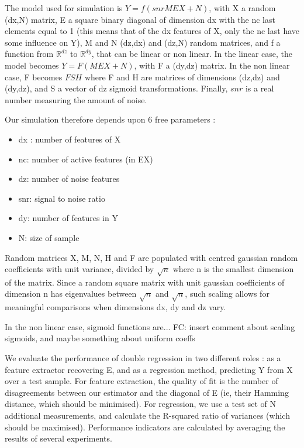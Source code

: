 \documentclass{article}
\begin{document}
The model used for simulation is $Y=f(snr MEX+N)$, with X a random (dx,N) matrix, E a square binary diagonal of dimension dx with the nc last elements equal to 1 (this means that of the dx features of X, only the nc last have some influence on Y), M and N (dz,dx) and (dz,N) random matrices, and f a function from $\mathbb{R}^{dz}$ to $\mathbb{R}^{dy}$, that can be linear or non linear. In the linear case, the model becomes $Y=F(MEX+N)$, with F a (dy,dz) matrix. In the non linear case, F becomes $FSH$ where F and H are matrices of dimensions (dz,dz) and (dy,dz), and S a vector of dz sigmoid transformations. Finally, $snr$ is a real number measuring the amount of noise. 

Our simulation therefore depends upon 6 free parameters : 
\begin{itemize}
\item dx : number of features of X
\item nc: number of active features (in EX)
\item dz: number of noise features
\item snr: signal to noise ratio
\item dy: number of features in Y
\item N: size of sample
\end{itemize}

Random matrices X, M, N, H and F are populated with centred gaussian random coefficients with unit variance, divided by $ \surd n$ where n is the smallest dimension of the matrix. Since a random square matrix with unit gaussian coefficients of dimension n has eigenvalues between $ \surd n $ and $\surd n $, such  scaling allows for meaningful comparisons when dimensions dx, dy and dz vary. 

In the non linear case, sigmoid functions are...
FC: insert comment about scaling sigmoids, and maybe something about uniform coeffs

We evaluate the performance of double regression in two different roles : as a feature extractor recovering E, and as a regression method, predicting Y from X over a test sample. For feature extraction, the quality of fit is the number of disagreements between our estimator and the diagonal of E (ie, their Hamming distance, which should be minimised). For regression, we use a test set of N additional measurements, and calculate the R-squared ratio of variances (which should be maximised). Performance indicators are calculated by averaging the results of several experiments.
\end{document}
